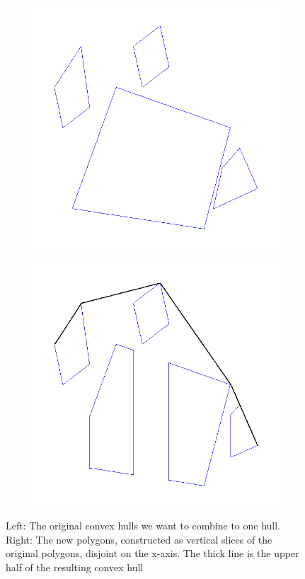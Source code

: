 \documentclass{article}
\begin{document}
\begin{figure}
    \centering
    \begin{subfigure}[b]{0.4\textwidth}
    \includegraphics[width=\textwidth]{images/before_new_polygons.png}
    \end{subfigure}
    \begin{subfigure}[b]{0.4\textwidth}
    \includegraphics[width=\textwidth]{images/new_polygons_with_half_hull.png}
    \end{subfigure}
    \caption{Left: The original convex hulls we want to combine to one hull. Right: The new polygons, constructed as vertical slices of the original polygons, disjoint on the x-axis. The thick line is the upper half of the resulting convex hull}
    \label{fig:vertical_slices}
\end{figure}
\end{document}
